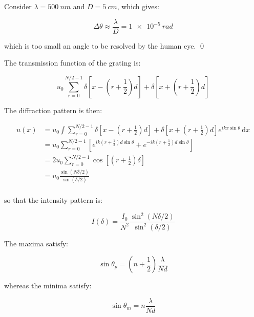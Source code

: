 \documentclass[12pt]{article}
\begin{document}
Consider $\lambda = \qty{500}{nm}$ and $D = \qty{5}{cm}$, which gives:

\begin{equation}
    \Delta \theta \approx \frac{\lambda}{D} = \qty{1e-5}{rad}
\end{equation}

which is too small an angle to be resolved by the human eye.
\qed



The transmission function of the grating is:

\begin{equation}
    u_{0} \sum_{r = 0}^{N/2 - 1} \delta[x - (r + \frac{1}{2})d] + \delta[x + (r + \frac{1}{2})d]
\end{equation}

The diffraction pattern is then:

\begin{equation}
    \begin{split}
        u(x) &= u_{0} \int \sum_{r = 0}^{N/2 - 1} \delta[x - (r + \frac{1}{2})d] + \delta[x + (r + \frac{1}{2})d] e^{i k x\sin{\theta}} \, \mathrm{d}x \\
        &= u_{0} \sum_{r = 0}^{N/2 - 1} \left[ e^{i k (r + \frac{1}{2})d \sin{\theta}} + e^{-i k (r + \frac{1}{2})d \sin{\theta}} \right] \\
        &= 2 u_{0} \sum_{r = 0}^{N/2 - 1} \cos{\left[ (r + \frac{1}{2}) \delta \right]} \\
        &= u_{0} \frac{\sin{(N\delta/2)}}{\sin{(\delta/2)}} \\
    \end{split}
\end{equation}

so that the intensity pattern is:

\begin{equation}
    I(\delta) = \frac{I_{0}}{N^{2}} \frac{\sin^{2}{(N\delta/2)}}{\sin^{2}{(\delta/2)}}
\end{equation}

The maxima satisfy:

\begin{equation}
    \sin{\theta_{p}} = \left( n + \frac{1}{2} \right) \frac{\lambda}{Nd}
\end{equation}

whereas the minima satisfy:

\begin{equation}
    \sin{\theta_{m}} = n \frac{\lambda}{Nd}
\end{equation}
\end{document}

